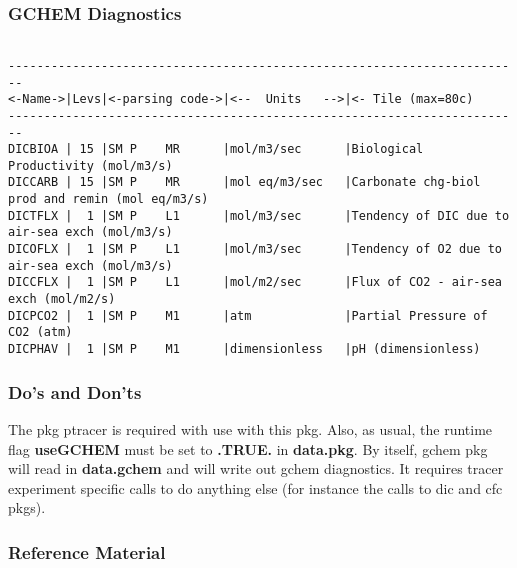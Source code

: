 \subsubsection{GCHEM Diagnostics}
\label{sec:pkg:gchem:diagnostics}

{\footnotesize
\begin{verbatim}

------------------------------------------------------------------------
<-Name->|Levs|<-parsing code->|<--  Units   -->|<- Tile (max=80c) 
------------------------------------------------------------------------
DICBIOA | 15 |SM P    MR      |mol/m3/sec      |Biological Productivity (mol/m3/s)
DICCARB | 15 |SM P    MR      |mol eq/m3/sec   |Carbonate chg-biol prod and remin (mol eq/m3/s)
DICTFLX |  1 |SM P    L1      |mol/m3/sec      |Tendency of DIC due to air-sea exch (mol/m3/s)
DICOFLX |  1 |SM P    L1      |mol/m3/sec      |Tendency of O2 due to air-sea exch (mol/m3/s)
DICCFLX |  1 |SM P    L1      |mol/m2/sec      |Flux of CO2 - air-sea exch (mol/m2/s)
DICPCO2 |  1 |SM P    M1      |atm             |Partial Pressure of CO2 (atm)
DICPHAV |  1 |SM P    M1      |dimensionless   |pH (dimensionless)
\end{verbatim}
}

\subsubsection{Do's and Don'ts}

The pkg ptracer is required with use with this pkg. Also, as usual, the
runtime flag \textbf{useGCHEM} must be set to \textbf{.TRUE.} in \textbf{data.pkg}.
By itself, gchem pkg will read in \textbf{data.gchem} and will
write out gchem diagnostics. It requires tracer experiment
specific calls to do anything else (for instance the calls
to dic and cfc pkgs).

\subsubsection{Reference Material}


